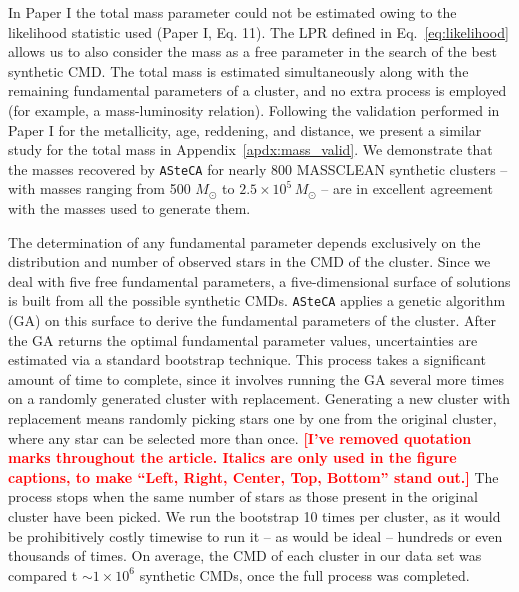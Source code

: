 \documentclass[draft]{aa}
\newcommand{\LEt}[1]{\textcolor{red}{\textbf{[#1]}}}
\begin{document}
%
In Paper I the total mass parameter could not be estimated owing to the
likelihood statistic used (Paper I, Eq. 11). The LPR defined in
Eq.~\ref{eq:likelihood} allows us to also consider the mass as a free parameter
in the search of the best synthetic CMD.\@
%
The total mass is estimated simultaneously along with the remaining
fundamental parameters of a cluster, and no extra process is employed (for example,
a mass-luminosity relation).
%
Following the validation performed in Paper I for the metallicity, age,
reddening, and distance, we present a similar study for the total mass  in
Appendix~\ref{apdx:mass_valid}. We demonstrate that the masses recovered by
\texttt{ASteCA} for nearly 800 MASSCLEAN synthetic clusters -- with
masses ranging from 500 $M_{\odot}$ to $2.5\times10^5\,M_{\odot}$ -- are in
excellent agreement with the masses used to generate them.

The determination of any fundamental parameter depends exclusively on
the distribution and number of observed stars in the CMD of the cluster.\@
Since we deal with five free fundamental parameters, a five-dimensional surface of
solutions is built from all the possible synthetic CMDs.
\texttt{ASteCA} applies a genetic algorithm (GA) on this surface to derive the
fundamental parameters of the cluster.
%
%
After the GA returns the optimal fundamental parameter values, uncertainties are
estimated via a standard bootstrap technique. This process takes a significant
amount of time to complete, since it involves running the GA several more times
on a randomly generated cluster with replacement. Generating a new
cluster with replacement means randomly picking stars one by one from the
original cluster, where any star can be selected more than once. \LEt{I've
removed quotation marks throughout the article. Italics are only used in the
figure captions, to make ``Left, Right, Center, Top, Bottom'' stand out.}
The process stops when the same number of stars as those present in the original
cluster have been picked.
We run the bootstrap 10 times per cluster, as it would be prohibitively
costly timewise to run it -- as would be ideal -- hundreds or even thousands of
times.
On average, the CMD of each cluster in our data set was compared t
${\sim}1{\times}10^6$ synthetic CMDs, once the full process was completed.
\end{document}

